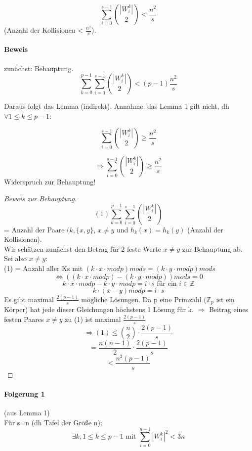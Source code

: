 $$ \sum_{i=0}^{s-1} \binom{|W_i^k|}{2} < \frac{n^2}{s}$$
(Anzahl der Kollisionen < $\frac{n^2}{s}$). \\

\paragraph{Beweis} zunächst: Behauptung.
$$ \sum_{k=0}^{p-1} \sum_{i=0}^{s-1} \binom{|W_i^k|}{2} <  (p-1)\frac{n^2}{s}$$

Daraus folgt das Lemma (indirekt). Annahme, das Lemma 1 gilt nicht, dh $\forall 1\leq k\leq p-1: $

$$ \sum_{i=0}^{s-1} \binom{|W_i^k|}{2} \geq \frac{n^2}{s}$$

$$ \Rightarrow  \sum_{i=0}^{s-1} \binom{|W_i^k|}{2} \geq \frac{n^2}{s}$$
Widerspruch zur Behauptung!

\begin{proof}[Beweis zur Behauptung]

$$ (1)\sum_{k=0}^{p-1} \sum_{i=0}^{s-1} \binom{|W_i^k|}{2}$$
= Anzahl der Paare $ (k, \{x,y\} $, $ x\neq y$ und $ h_k(x) = h_k(y) $ (Anzahl der Kollisionen).\\
Wir schätzen zunächst den Betrag für 2 feste Werte $ x \neq y $ zur Behauptung ab.\\

Sei also $ x \neq y $: \\
(1) = Anzahl aller Ks mit $ (k\cdot x\cdot mod p)mods = (k \cdot y\cdot modp)mods $
\[ \Leftrightarrow ((k\cdot x\cdot mod p)-(k\cdot y\cdot mod p))mods = 0 \]
\[ k\cdot x\cdot mod p - k\cdot y\cdot mod p = i \cdot s \text{ für ein } i\in \mathbb{Z} \]
\[k\cdot (x-y) mod p = i\cdot s \]
Es gibt maximal $ \frac{2(p-1)}{s} $ mögliche Lösungen. Da p eine Primzahl ($ \mathbb{Z}_p $ ist ein Körper) hat jede dieser Gleichungen höchstens 1 Lösung für k.
$ \Rightarrow $ Beitrag eines festen Paares $ x \neq y $ zu (1) ist maximal $ \frac{2(p-1)}{s} $ \\

\[ \Rightarrow (1) \leq \binom{n}{2} \cdot \frac{2(p-1)}{s}\]
\[ = \frac{n(n-1)}{2} \cdot \frac{2(p-1)}{s}\]
\[ < \frac{n^2(p-1)}{s}\]

\end{proof}

\paragraph{Folgerung 1} (aus Lemma 1) \\
Für s=n (dh Tafel der Größe n): 
$$\exists k ,1 \leq k \leq p-1 \text{ mit } \sum_{i=0}^{n-1} |W_i^k|^2 < 3n$$

